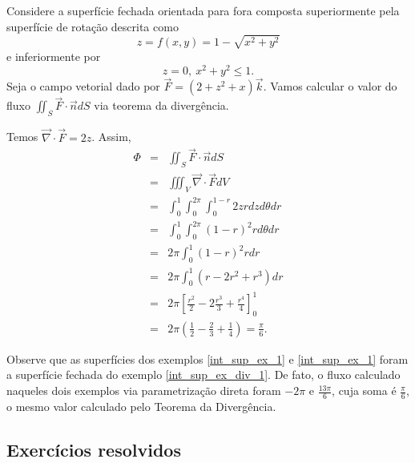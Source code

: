 \begin{ex}\label{int_sup_ex_div_1} Considere a superfície fechada orientada para fora composta superiormente pela superfície de rotação descrita como
$$z=f(x,y)=1- \sqrt{x^2+y^2}$$ e inferiormente por
$$z=0,~ {x^2+y^2}\leq 1.$$
Seja o campo vetorial dado por
$\vec{F}=(2+z^2+x)\vec{k}$. Vamos calcular o valor do fluxo $\iint_S\vec{F}\cdot \vec{n} dS$ via teorema da divergência.

Temos $\vec{\nabla}\cdot \vec{F}=2z$. Assim,
\begin{eqnarray*}
\Phi&=&\iint_S \vec{F}\cdot \vec{n}dS\\
&=&\iiint_V \vec{\nabla}\cdot \vec{F} dV\\
&=&\int_0^1 \int_0^{2\pi}  \int_0^{1-r} 2z rdzd\theta dr\\
&=&\int_0^1 \int_0^{2\pi}   (1-r)^2 rd\theta dr\\
&=&2\pi \int_0^1    (1-r)^2 r dr\\
&=&2\pi \int_0^1    \left(r-2r^2+r^3\right) dr\\
&=&2\pi  \left[\frac{r^2}{2}-2\frac{r^3}{3}+\frac{r^4}{4}\right]_{0}^1\\
&=&2\pi  \left(\frac{1}{2}-\frac{2}{3}+\frac{1}{4}\right)=\frac{\pi}{6}.
\end{eqnarray*}

Observe que as superfícies dos exemplos \ref{int_sup_ex_1} e \ref{int_sup_ex_1} foram a superfície fechada do exemplo \ref{int_sup_ex_div_1}. De fato, o fluxo calculado naqueles dois exemplos via parametrização direta foram $-2\pi$ e $\frac{13\pi}{6}$, cuja soma é $\frac{\pi}{6}$, o mesmo valor calculado pelo Teorema da Divergência.
\end{ex}


\subsection*{Exercícios resolvidos}

